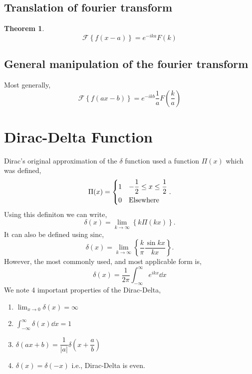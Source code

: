 \documentclass{book}
\newtheorem*{theorem}{Theorem}
\begin{document}
\subsection{Translation of fourier transform}
\begin{theorem}
	\begin{equation}
		\boxed{\mathscr{F}\left\{f(x - a)\right\} = e^{-ika}F(k)}
	\end{equation}
\end{theorem}
\subsection{General manipulation of the fourier transform}
Most generally,
\begin{equation}
	\boxed{\mathscr{F}\left\{f(ax - b)\right\} = e^{-ikb}\frac{1}{a}F\left(\frac{k}{a}\right)}
\end{equation}
\section{Dirac-Delta Function}
Dirac's original approximation of the $\delta$ function used a function $\Pi(x)$ which was defined,
\begin{equation}
	\Pi(x) = \begin{dcases}
		1 & -\frac{1}{2} \leq x \leq \frac{1}{2} \\
		0 & \text{Elsewhere}
	\end{dcases}.
\end{equation}
Using this definiton we can write,
\begin{equation}
	\delta(x) = \lim_{k \to \infty} \left\{k\Pi(kx)\right\}.
\end{equation}
It can also be defined using $\mathrm{sinc}$,
\begin{equation}
	\delta(x) = \lim_{k \to \infty}\left\{\frac{k}{\pi}\frac{\sin{kx}}{kx}\right\}.
\end{equation}
However, the most commonly used, and most applicable form is,
\begin{equation}
	\boxed{\delta(x) = \frac{1}{2\pi}\int_{-\infty}^{\infty}e^{ikx}\dd{x}}
\end{equation}
We note 4 important properties of the Dirac-Delta,
\begin{enumerate}
	\item $\displaystyle \lim_{x \to 0}\delta(x) = \infty$ 
	\item $\displaystyle \int_{-\infty}^{\infty}\delta(x)\dd{x} = 1$
	\item $\displaystyle \delta(ax + b) = \dfrac{1}{|a|}\delta\left(x + \dfrac{a}{b}\right)$
	\item $\delta(x) = \delta(-x)$ i.e., Dirac-Delta is even.
\end{enumerate}
\end{document}
